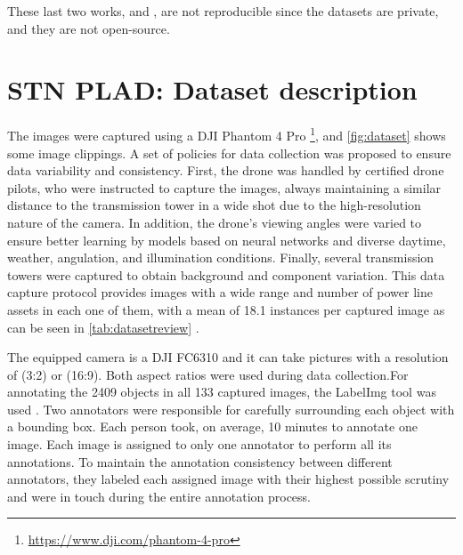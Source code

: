 \documentclass[10pt,conference]{IEEEtran}
\begin{document}
These last two works, \cite{kong2018context} and \cite{zhu2018multi}, are not reproducible since the datasets are private, and they are not open-source.


\section{STN PLAD: Dataset description}




\label{sec:dataset}


The images were captured using a DJI Phantom 4 Pro \footnote{\url{https://www.dji.com/phantom-4-pro}}, and \autoref{fig:dataset} shows some image clippings. A set of policies for data collection was proposed to ensure data variability and consistency. First, the drone was handled by certified drone pilots, who were instructed to capture the images, always maintaining a similar distance to the transmission tower in a wide shot due to the high-resolution nature of the camera. In addition, the drone's viewing angles were varied to ensure better learning by models based on neural networks and diverse daytime, weather, angulation, and illumination conditions. Finally, several transmission towers were captured to obtain background and component variation. This data capture protocol provides images with a wide range and number of power line assets in each one of them, with a mean of 18.1 instances per captured image as can be seen in \autoref{tab:datasetreview} .

The equipped camera is a DJI FC6310 and it can take pictures with a resolution of  (3:2) or  (16:9). Both aspect ratios were used during data collection.For annotating the 2409 objects in all 133 captured images, the LabelImg tool was used \cite{tzutalin2015labelimg}. Two annotators were responsible for carefully surrounding each object with a bounding box. Each person took, on average, 10 minutes to annotate one image. Each image is assigned to only one annotator to perform all its annotations. To maintain the annotation consistency between different annotators, they labeled each assigned image with their highest possible scrutiny and were in touch during the entire annotation process. 
\end{document}
